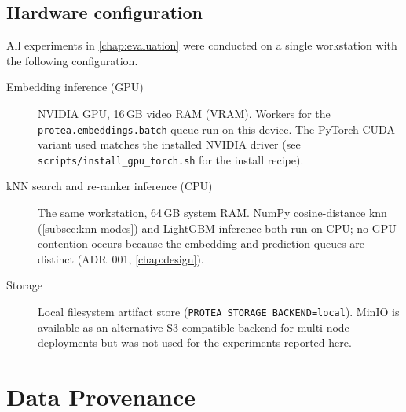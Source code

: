 \subsection{Hardware configuration}
\label{app:repro-hardware}

All experiments in \cref{chap:evaluation} were conducted on a single
workstation with the following configuration.

\begin{description}
  \item[Embedding inference (GPU)] NVIDIA GPU, 16\,GB video RAM (VRAM).
    Workers for the \texttt{protea.embeddings.batch} queue run on this
    device. The PyTorch CUDA variant used matches the installed NVIDIA
    driver (see \texttt{scripts/install\_gpu\_torch.sh} for the
    install recipe).
  \item[kNN search and re-ranker inference (CPU)] The same workstation,
    64\,GB system RAM. NumPy cosine-distance \gls{knn} (\cref{subsec:knn-modes})
    and LightGBM inference both run on CPU; no GPU contention occurs
    because the embedding and prediction queues are distinct
    (ADR~001, \cref{chap:design}).
  \item[Storage] Local filesystem artifact store
    (\texttt{PROTEA\_STORAGE\_BACKEND=local}). MinIO is available as
    an alternative S3-compatible backend for multi-node deployments
    but was not used for the experiments reported here.
\end{description}

\section{Data Provenance}
\label{app:repro-data}

